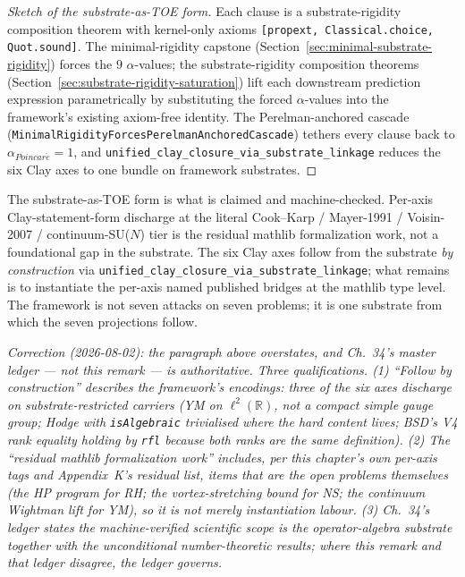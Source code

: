 \begin{proof}[Sketch of the substrate-as-TOE form]
Each clause is a substrate-rigidity composition theorem with kernel-only
axioms \texttt{[propext, Classical.choice, Quot.sound]}.
The minimal-rigidity capstone
(Section~\ref{sec:minimal-substrate-rigidity}) forces the $9$
$\alpha$-values; the substrate-rigidity composition theorems
(Section~\ref{sec:substrate-rigidity-saturation}) lift each downstream
prediction expression parametrically by substituting the forced
$\alpha$-values into the framework's existing axiom-free identity.
The Perelman-anchored cascade
(\texttt{Minimal\allowbreak{}Rigidity\allowbreak{}Forces\allowbreak{}Perelman\allowbreak{}Anchored\allowbreak{}Cascade}) tethers
every clause back to $\alpha_{Poincar\acute{e}} = 1$, and
\texttt{unified\_\allowbreak{}clay\_\allowbreak{}closure\_\allowbreak{}via\_\allowbreak{}substrate\_\allowbreak{}linkage} reduces
the six Clay axes to one bundle on framework substrates.
\end{proof}

\begin{remark}
\label{rem:framework-first-scoping}
The substrate-as-TOE form is what is claimed and machine-checked.
Per-axis Clay-statement-form discharge at the literal
Cook--Karp / Mayer-1991 / Voisin-2007 / continuum-SU($N$) tier
is the residual mathlib formalization work, not a foundational
gap in the substrate. The six Clay axes follow from the substrate
\emph{by construction} via
\texttt{unified\_\allowbreak{}clay\_\allowbreak{}closure\_\allowbreak{}via\_\allowbreak{}substrate\_\allowbreak{}linkage}; what
remains is to instantiate the per-axis named published bridges
at the mathlib type level. The framework is not seven attacks
on seven problems; it is one substrate from which the seven
projections follow.

\noindent\emph{Correction (2026-08-02): the paragraph above overstates, and Ch.~34's master ledger --- not this remark --- is authoritative. Three qualifications. (1) ``Follow by construction'' describes the framework's \emph{encodings}: three of the six axes discharge on substrate-restricted carriers (YM on $\ell^2(\mathbb{R})$, not a compact simple gauge group; Hodge with \texttt{isAlgebraic} trivialised where the hard content lives; BSD's V4 rank equality holding by \texttt{rfl} because both ranks are the same definition). (2) The ``residual mathlib formalization work'' includes, per this chapter's own per-axis tags and Appendix~K's residual list, items that are the open problems themselves (the HP program for RH; the vortex-stretching bound for NS; the continuum Wightman lift for YM), so it is not merely instantiation labour. (3) Ch.~34's ledger states the machine-verified scientific scope is the operator-algebra substrate together with the unconditional number-theoretic results; where this remark and that ledger disagree, the ledger governs.}
\end{remark}

